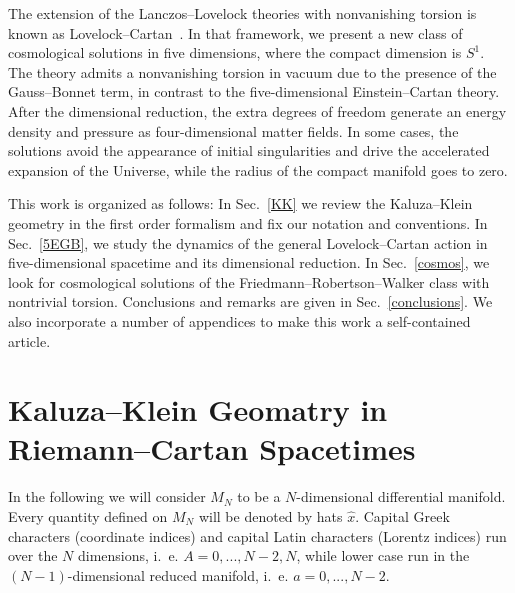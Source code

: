 \documentclass[aps,prd,12pt,superscriptaddress,showpacs,showkeys,longbibliography,reprint,nofootinbib]{revtex4-1}
\begin{document}
The extension of the Lanczos--Lovelock theories with nonvanishing torsion is known as Lovelock--Cartan~\cite{Mardones:1990qc}. In that framework, we present a new class of cosmological solutions in five dimensions, where the compact dimension is $S^1$. The theory admits a nonvanishing torsion in vacuum due to the presence of the Gauss--Bonnet term, in contrast to the five-dimensional Einstein--Cartan theory. After the dimensional reduction, the extra degrees of freedom generate an energy density and pressure as four-dimensional matter fields. In some cases, the solutions avoid the appearance of initial singularities and drive the accelerated expansion of the Universe, while the radius of the compact manifold goes to zero.  

This work is organized as follows: In Sec.~\ref{KK} we review the Kaluza--Klein geometry in the first order formalism and fix our notation and conventions. In Sec.~\ref{5EGB}, we study the dynamics of the general Lovelock--Cartan action in five-dimensional spacetime and its dimensional reduction. In Sec.~\ref{cosmos}, we look for cosmological solutions of the Friedmann--Robertson--Walker class with nontrivial torsion. Conclusions and remarks are given in Sec.~\ref{conclusions}. We also incorporate a number of appendices to make this work a self-contained article.


\section{Kaluza--Klein Geomatry in Riemann--Cartan Spacetimes\label{KK}}

In the following we will consider $M_N$ to be a $N$-dimensional differential manifold. Every quantity defined on $M_N$ will be denoted by hats $\hat{x}$. Capital Greek characters (coordinate indices) and capital Latin characters (Lorentz indices) run over the $N$ dimensions, i.~e. $A = 0,...,N-2,N$, while lower case run in the $(N-1)$-dimensional reduced manifold, i.~e. $a = 0,...,N-2$.
\end{document}
